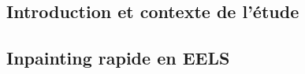 \documentclass[a4paper, asymetric, table, justified,
               nofonts, nobib, nohyper, 10pt, french]{tufte-book}
\begin{document}

\frontmatter
\makeflyleaf
\pagestyle{fancyfrontmatter}

\setcounter{chapter}{-1}
\setcounter{secnumdepth}{3}
\setcounter{tocdepth}{1}

%
%



%
%



%
%





%
%

\begin{fullwidth}
    \tableofcontents
\end{fullwidth}


%
%


%
%



\mainmatter
\setcounter{tocdepth}{2}

%
%


%
%

\begin{fullwidth}
	\part{Introduction et contexte de l'étude}
\end{fullwidth}





%
%

\begin{fullwidth}
	\part{Inpainting rapide en EELS}
\end{fullwidth}
\end{document}
